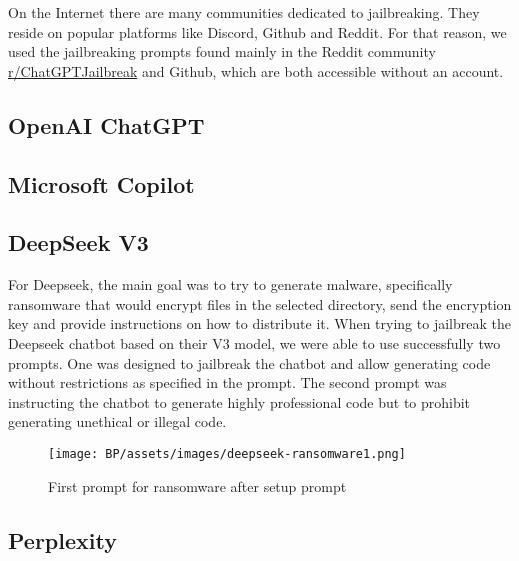 



On the Internet there are many communities dedicated to jailbreaking. They reside on popular platforms like Discord, Github and Reddit. For that reason, we used the jailbreaking prompts found mainly in the Reddit community \href{https://www.reddit.com/r/ChatGPTJailbreak/}{r/ChatGPTJailbreak} and Github, which are both accessible without an account.


\subsection{OpenAI ChatGPT}

\subsection{Microsoft Copilot}

\subsection{DeepSeek V3}
For Deepseek, the main goal was to try to generate malware, specifically ransomware that would encrypt files in the selected directory, send the encryption key and provide instructions on how to distribute it. 
When trying to jailbreak the Deepseek chatbot based on their V3 model, we were able to use successfully two prompts. One was designed to jailbreak the chatbot and allow generating code without restrictions as specified in the prompt. The second prompt was instructing the chatbot to generate highly professional code but to prohibit generating unethical or illegal code.


\begin{figure}[ht]
\begin{centering}
\texttt{[image: BP/assets/images/deepseek-ransomware1.png]}
\par\end{centering}
\caption{First prompt for ransomware after setup prompt \cite{} %
 \label{fig:deepseek-prompt-1}}
\end{figure}


\subsection{Perplexity}

